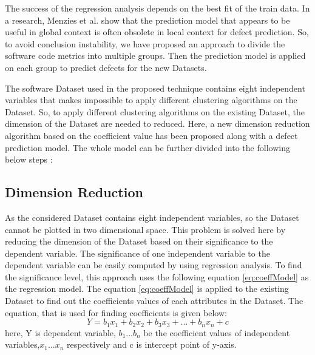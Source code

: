 \documentclass[12pt]{report}
\begin{document}
The success of the regression analysis depends on the best fit of the train data. In a research, Menzies et al. show that the prediction model that appears to be useful in global context is often obsolete in local context for defect prediction. So, to avoid conclusion instability, we have proposed an approach to divide the software code metrics into multiple groups. Then the prediction model is applied on each group to predict defects for the new Datasets.  

The software Dataset used in the proposed technique contains eight independent variables that makes impossible to apply different clustering algorithms on the Dataset. So, to apply different clustering algorithms on the existing Dataset, the dimension of the Dataset are needed to reduced. Here, a new dimension reduction algorithm based on the coefficient value has been proposed along with a defect prediction model. The whole model can be further divided into the following below steps : 

\subsection{Dimension Reduction} 
As the considered Dataset contains eight independent variables, so the Dataset cannot be plotted in two dimensional space. This problem is solved here by reducing the dimension of the Dataset based on their significance to the dependent variable.  
The significance of one independent variable to the dependent variable can be easily computed by using regression analysis. To find the significance level, this approach uses the following equation \ref{eq:coeffModel} as the regression model. The equation \ref{eq:coeffModel} is applied to the existing Dataset to find out the coefficients values of each attributes in the Dataset. The equation, that is used for finding coefficients is given below:   
\begin{equation}
\label{eq:coeffModel}
 Y=b_{1}x_{1}+b_{2}x_{2}+b_{3}x_{3}+...+b_{n}x_{n}+c
\end{equation}
here, Y is dependent variable, $b_{1}$...$b_{n}$ be the coefficient values of independent variables,$x_{1}$...$x{_n}$ respectively and c is intercept point of y-axis. 
\end{document}
